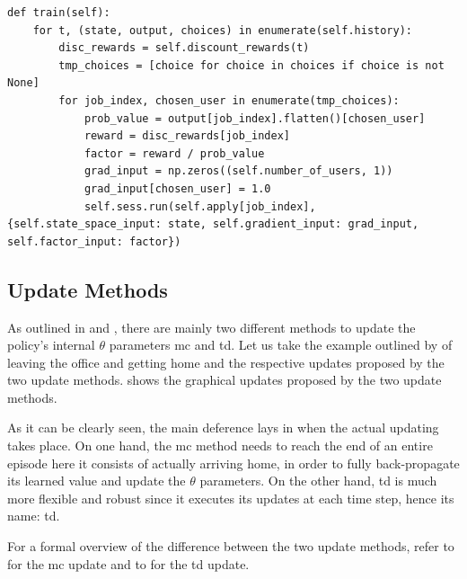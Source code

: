 \begin{lstlisting}[caption=Backpropagation algorithm following a \glsentryshort{mc} update approach,label=lst:mc_backpropagation,style=CustomPython]
def train(self):
    for t, (state, output, choices) in enumerate(self.history):
        disc_rewards = self.discount_rewards(t)
        tmp_choices = [choice for choice in choices if choice is not None]
        for job_index, chosen_user in enumerate(tmp_choices):
            prob_value = output[job_index].flatten()[chosen_user]
            reward = disc_rewards[job_index]
            factor = reward / prob_value
            grad_input = np.zeros((self.number_of_users, 1))
            grad_input[chosen_user] = 1.0
            self.sess.run(self.apply[job_index], {self.state_space_input: state, self.gradient_input: grad_input, self.factor_input: factor})
\end{lstlisting}

\subsection{Update Methods}
\label{subsec:update_methods}

As outlined in  and , there are mainly two different methods to update the policy's internal $\theta$ parameters \ie \gls{mc} and \gls{td}. Let us take the example outlined by \citet[p. 130]{Sutton2017} of leaving the office and getting home and the respective updates proposed by the two update methods.  shows the graphical updates proposed by the two update methods.


As it can be clearly seen, the main deference lays in when the actual updating takes place. On one hand, the \gls{mc} method needs to reach the end of an entire episode \eg here it consists of actually arriving home, in order to fully back-propagate its learned value and update the $\theta$ parameters. On the other hand, \gls{td} is much more flexible and robust since it executes its updates at each time step, hence its name: \gls{td}.

For a formal overview of the difference between the two update methods, refer to  for the \gls{mc} update and to  for the \gls{td} update.

